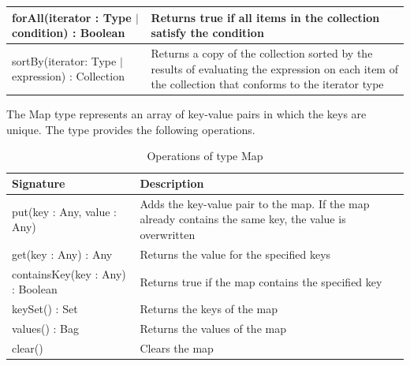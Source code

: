 \begin{longtable} {|p{5.5cm}|p{6.5cm}|}
			forAll(iterator : Type $|$ condition) : Boolean & Returns true if all items in the collection satisfy the condition \\\hline
			
			
			sortBy(iterator: Type $|$ expression) : Collection & Returns a copy of the collection sorted by the results of evaluating the expression on each item of the collection that conforms to the iterator type \\\hline

\end{longtable}

The Map type represents an array of key-value pairs in which the keys are unique. The type provides the following operations.

\begin{longtable} {|p{5.5cm}|p{6.5cm}|}
			
			\caption{Operations of type Map}
			\label{tab:MapOperations}\\
			
			\hline
			
			\textbf{Signature} & \textbf{Description} \\\hline

			put(key : Any, value : Any) & Adds the key-value pair to the map. If the map already contains the same key, the value is overwritten\\\hline
				
			get(key : Any) : Any & Returns the value for the specified keys\\\hline
	
			containsKey(key : Any) : Boolean & Returns true if the map contains the specified key\\\hline
	
			keySet() : Set & Returns the keys of the map\\\hline
			
			values() : Bag & Returns the values of the map\\\hline
			
			clear() & Clears the map\\\hline
			
\end{longtable}

